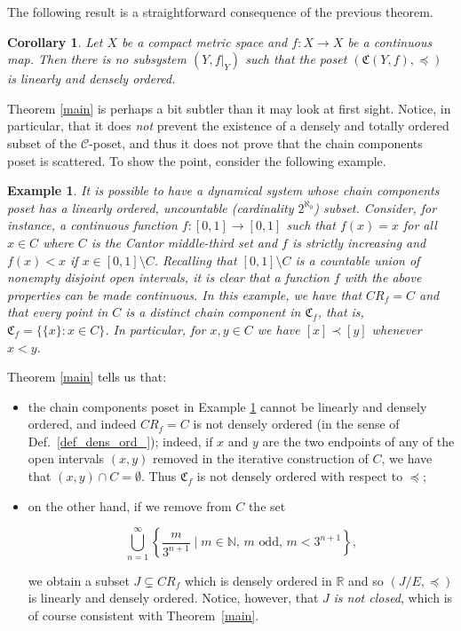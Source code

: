 \documentclass[pdflatex,sn-mathphys-num]{sn-jnl}
\theoremstyle{thmstyleone}%
\newtheorem{cor}[thm]{Corollary}
\theoremstyle{thmstyletwo}%
\newtheorem{exa}{Example}%
\theoremstyle{thmstylethree}%
\begin{document}
\noindent The following result is a straightforward consequence of the previous theorem.

\begin{cor}\label{cor_subsystem}
Let $X$ be a compact metric space and $f:X\rightarrow X$ be a continuous map. Then there is no subsystem $(Y,f|_Y)$ such that the poset $(\mathfrak{C}(Y,f),\preceq)$ is linearly and densely ordered.    
\end{cor}


    \noindent Theorem \ref{main} is perhaps a bit subtler than it may look at first sight. Notice, in particular, that it does \emph{not} prevent the existence of a densely and totally ordered subset of the $\mathcal{C}$-poset, and thus it does not prove that the chain components poset is scattered. To show the point, consider the following example. 
    
\begin{exa}\label{cantor__}
    It is possible to have a dynamical system whose chain components poset has a linearly ordered, uncountable (cardinality $2^{\aleph_0}$) subset. 
    Consider, for instance, a continuous function $f:[0,1]\rightarrow [0,1]$ such that $f(x)=x$ for all $x\in C$ where $C$ is the Cantor middle-third set and $f$ is strictly increasing and $f(x)<x$ if $x\in [0,1]\setminus C$. Recalling that $[0,1]\setminus C$ is a countable union of nonempty disjoint open intervals, it is clear that a function $f$ with the above properties can be made continuous. 
    In this example, we have that $CR_f=C$ and that every point in $C$ is a distinct chain component in $\mathfrak{C}_f$, that is, $\mathfrak{C}_f=\{ \{x\} : x\in C\}$. 
    In particular, for $x,y\in C$ we have $[x]\prec [y]$ whenever $x<y$.
\end{exa}
    
    
Theorem \ref{main} tells us that: 
    \begin{itemize}
        \item the chain components poset in Example \ref{cantor__} cannot be linearly and densely ordered, and indeed $CR_f=C$ is not densely ordered (in the sense of Def.~\ref{def_dens_ord_}); indeed, if $x$ and $y$ are the two endpoints of any of the open intervals $(x,y)$ removed in the iterative construction of $C$, we have that $(x,y)\cap C=\emptyset$. Thus $\mathfrak{C}_f$ is not densely ordered with respect to $\preceq$;
        \item on the other hand, if we remove from $C$ the set 

    $$\bigcup_{n=1}^{\infty} \left\{ \frac{m}{3^{n+1}} \mid m \in \mathbb{N}, \, m \text{ odd}, \, m < 3^{n+1} \right\},$$
    
we obtain a subset $J\subsetneq CR_f$ which is densely ordered in $\mathbb{R}$ and so $(J/E,\preceq)$ is linearly and densely ordered. 
Notice, however, that $J$ \emph{is not closed}, which is of course consistent with Theorem~\ref{main}.
    \end{itemize}
    
\end{document}
